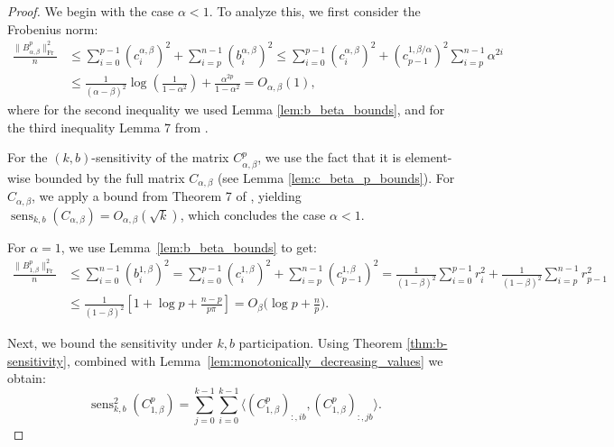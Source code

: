 \documentclass{article} %
\newcommand{\senskb}{\operatorname{sens}_{k, b}}
\begin{document}
\maintheorem*

\begin{proof}

We begin with the case $\alpha < 1$. To analyze this, we first consider the Frobenius norm:
\begin{equation}
\begin{aligned}
\frac{\|B_{\alpha, \beta}^p\|_{\text{Fr}}^2}{n} &\le \sum\limits_{i = 0}^{p - 1} (c_i^{\alpha, \beta})^2 + \sum\limits_{i = p}^{n - 1} (b_{i}^{\alpha, \beta})^2 \le \sum\limits_{i = 0}^{p - 1} (c_i^{\alpha, \beta})^2 + (c^{1, \beta/\alpha}_{p - 1})^2\sum\limits_{i = p}^{n - 1} \alpha^{2i}  \\
&\le  \frac{1}{(\alpha - \beta)^2}\log \left(\frac{1}{1 - \alpha^2}\right) + \frac{\alpha^{2p}}{1 - \alpha^2} =  O_{\alpha, \beta}(1),
\end{aligned}
\end{equation}
where for the second inequality we used Lemma \ref{lem:b_beta_bounds}, and for the third inequality Lemma 7 from \citet{kalinin2024}.

For the $(k, b)$-sensitivity of the matrix $C_{\alpha, \beta}^p$, we use the fact that it is element-wise bounded by the full matrix $C_{\alpha, \beta}$ (see Lemma \ref{lem:c_beta_p_bounds}). For $C_{\alpha, \beta}$, we apply a bound from Theorem 7 of \citet{kalinin2024}, yielding $\senskb(C_{\alpha, \beta}) = O_{\alpha, \beta}(\sqrt{k})$, which concludes the case $\alpha < 1$.

For $\alpha = 1$, we use Lemma~\ref{lem:b_beta_bounds} to get:
\begin{equation}
\begin{aligned}
    \frac{\|B_{1, \beta}^p\|_{\text{Fr}}^2}{n} &\le \sum\limits_{i = 0}^{n - 1} (b_i^{1, \beta})^2 = \sum\limits_{i = 0}^{p - 1}(c^{1, \beta}_i)^2 + \sum\limits_{i = p}^{n - 1}(c^{1, \beta}_{p - 1})^2 =  \frac{1}{(1 - \beta)^2}\sum\limits_{i = 0}^{p - 1}r_i^2 + \frac{1}{(1 - \beta)^2}\sum\limits_{i = p}^{n - 1}r_{p - 1}^2\\
    &\le \frac{1}{(1 - \beta)^2}\left[1 + \log p + \frac{n - p}{p\pi}\right] = O_{\beta} \bigg(\log p + \frac{n}{p}\bigg).
\end{aligned}
\end{equation}

Next, we bound the sensitivity under $k, b$ participation. Using Theorem \ref{thm:b-sensitivity}, combined with Lemma~\ref{lem:monotonically_decreasing_values} we obtain:
%
\begin{equation}
    \senskb^2(C_{1, \beta}^p) = \sum\limits_{j = 0}^{k - 1}\sum\limits_{i = 0}^{k - 1} \langle (C_{1, \beta}^p)_{:,ib}, (C_{1, \beta}^p)_{:,jb} \rangle.
\end{equation}


\end{proof}
\end{document}
